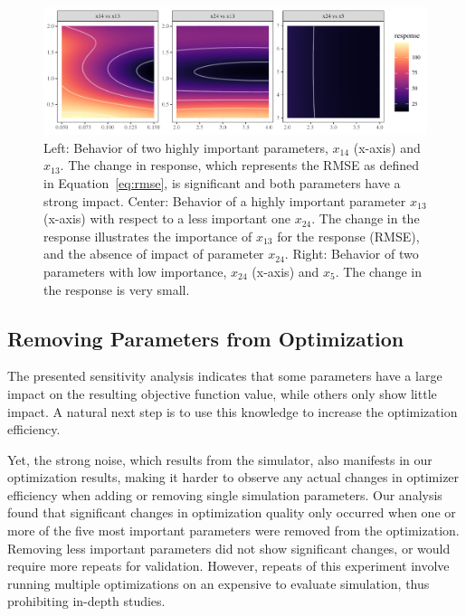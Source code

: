 \documentclass[conference]{IEEEtran}
\begin{document}

\begin{figure}
  \centering
  \includegraphics{model-contour.pdf}
  \caption{Left: 
  Behavior of two highly important parameters, \emph{$x_{14}$} (x-axis) and \emph{$x_{13}$}. 
  The change in response, which represents the \gls{RMSE} as defined in Equation~\ref{eq:rmse}, is significant and both parameters have a strong impact.
  Center: Behavior of a highly important parameter \emph{$x_{13}$} (x-axis) with respect to a less important one \emph{$x_{24}$}. The change in the response illustrates the importance of \emph{$x_{13}$} for the response (\gls{RMSE}), and the absence of impact of parameter \emph{$x_{24}$}.
  Right: Behavior of two parameters with low importance, \emph{$x_{24}$} (x-axis) and \emph{$x_{5}$}.
  The change in the response is very small.
  }
  \label{fig:model-contours}
\end{figure}

\subsection{Removing Parameters from Optimization}\label{sec:removing}
The presented sensitivity analysis indicates that some parameters have a large impact on the resulting objective function value, while others only show little impact. 
A natural next step is to use this knowledge to increase the optimization efficiency. 

Yet, the strong noise, which results from the simulator, also manifests in our optimization results, making it harder to observe any actual changes in optimizer efficiency when adding or removing single simulation parameters.
Our analysis found that significant changes in optimization quality only occurred when one or more of the five most important parameters were removed from the optimization. 
Removing less important parameters did not show significant changes, or would require more repeats for validation. 
However, repeats of this experiment involve running multiple optimizations on an expensive to evaluate simulation, thus prohibiting in-depth studies.  
\end{document}
